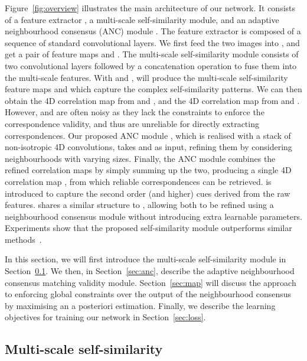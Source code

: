 \documentclass[10pt,twocolumn,letterpaper]{article}
\begin{document}
Figure~\ref{fig:overview} illustrates the main architecture of our network.
It consists of a feature extractor , a multi-scale self-similarity module,  and an adaptive neighbourhood consensus (ANC) module . 
The feature extractor  is composed of a sequence of standard convolutional layers.
We first feed the two images into , and get a pair of feature maps  and . 
The multi-scale self-similarity module  consists of two convolutional layers followed by a concatenation operation to fuse them into the multi-scale features. 
With  and ,  will produce the multi-scale self-similarity feature maps  and  which capture the complex self-similarity patterns. 
We can then obtain the 4D correlation map  from  and , and the 4D correlation map  from  and .
However,  and  are often noisy as they lack the constraints to enforce the correspondence validity, and thus are unreliable for directly extracting correspondences. 
Our proposed ANC module , which is realised with a stack of non-isotropic 4D convolutions, takes  and  as input, refining them by considering neighbourhoods with varying sizes.
Finally, the ANC module combines the refined correlation maps by simply summing up the two, producing a single 4D correlation map , from which reliable correspondences can be retrieved.
 is introduced to capture the second order (and higher) cues derived from the raw features.  shares a similar structure to , allowing both to be refined using a neighbourhood consensus module without introducing extra learnable parameters.
Experiments show that the proposed self-similarity module outperforms similar methods~\cite{Kim_CVPR17_FCSS, Huang_ICCV19_DCCNet}.













In this section, we will first introduce the multi-scale self-similarity module in Section~\ref{sec:mss}. We then, in Section~\ref{sec:anc}, describe the adaptive neighbourhood consensus matching validity module. Section~\ref{sec:map} will discuss the approach to enforcing global constraints over the output of the neighbourhood consensus by maximising an a posteriori estimation. Finally, we describe the learning objectives for training our network in Section~\ref{sec:loss}.



\subsection{Multi-scale self-similarity}
\label{sec:mss}
\end{document}
